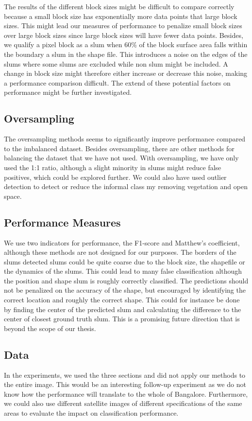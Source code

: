 The results of the different block sizes might be difficult to compare correctly because a small block size has exponentially more data points that large block sizes. This might lead our measures of performance to penalize small block sizes over large block sizes since large block sizes will have fewer data points. Besides, we qualify a pixel block as a slum when 60\% of the block surface area falls within the boundary a slum in the shape file. This introduces a noise on the edges of the slums where some slums are excluded while non slum might be included. A change in block size might therefore either increase or decrease this noise, making a performance comparison difficult. The extend of these potential factors on performance might be further investigated.

\subsection{Oversampling}
The oversampling methods seems to significantly improve performance compared to the imbalanced dataset. Besides oversampling, there are other methods for balancing the dataset that we have not used. With oversampling, we have only used the 1:1 ratio, although a slight minority in slums might reduce false positives, which could be explored further. We could also have used outlier detection to detect or reduce the informal class my removing vegetation and open space. 

\subsection{Performance Measures}
We use two indicators for performance, the F1-score and Matthew's coefficient, although these methods are not designed for our purposes. The borders of the slums detected slums could be quite coarse due to the block size, the shapefile or the dynamics of the slums. This could lead to many false classification although the position and shape slum is roughly correctly classified. The predictions should not be penalized on the accuracy of the shape, but encouraged by identifying the correct location and roughly the correct shape. This could for instance be done by finding the center of the predicted slum and calculating the difference to the center of closest ground truth slum. This is a promising future direction that is beyond the scope of our thesis.

\subsection{Data}
In the experiments, we used the three sections and did not apply our methods to the entire image. This would be an interesting follow-up experiment as we do not know how the performance will translate to the whole of Bangalore. Furthermore, we could also use different satellite images of different specifications of the same areas to evaluate the impact on classification performance.

